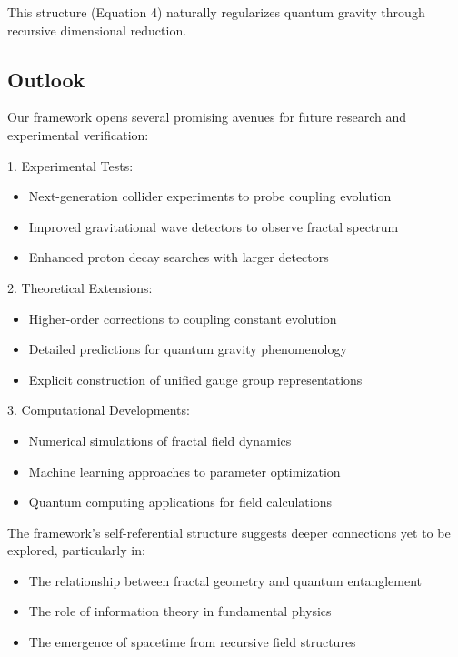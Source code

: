 \documentclass[12pt]{article}
\begin{document}
This structure (Equation 4) naturally regularizes quantum gravity through recursive dimensional reduction.

\subsection{Outlook}

Our framework opens several promising avenues for future research and experimental verification:

1. Experimental Tests:
   \begin{itemize}
   \item Next-generation collider experiments to probe coupling evolution \cite{lep2006}
   \item Improved gravitational wave detectors to observe fractal spectrum \cite{planck2020}
   \item Enhanced proton decay searches with larger detectors \cite{xenon2018}
   \end{itemize}

2. Theoretical Extensions:
   \begin{itemize}
   \item Higher-order corrections to coupling constant evolution
   \item Detailed predictions for quantum gravity phenomenology
   \item Explicit construction of unified gauge group representations
   \end{itemize}

3. Computational Developments:
   \begin{itemize}
   \item Numerical simulations of fractal field dynamics
   \item Machine learning approaches to parameter optimization
   \item Quantum computing applications for field calculations
   \end{itemize}

The framework's self-referential structure suggests deeper connections yet to be explored, particularly in:

\begin{itemize}
\item The relationship between fractal geometry and quantum entanglement
\item The role of information theory in fundamental physics
\item The emergence of spacetime from recursive field structures
\end{itemize}
\end{document}
